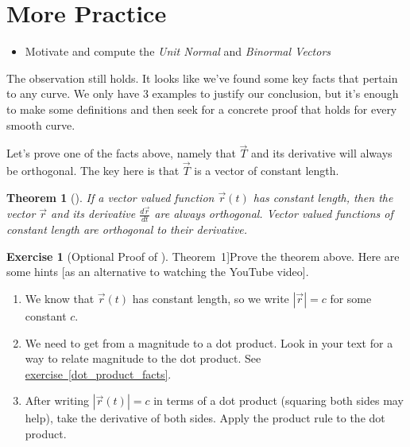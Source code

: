 \documentclass[10pt,]{book}
\theoremstyle{plain}
\newtheorem{theorem}{Theorem}[section]
\theoremstyle{definition}
\theoremstyle{definition}
\theoremstyle{definition}
\theoremstyle{definition}
\newtheorem{exploration}[project]{Exercise}
\theoremstyle{definition}
\numberwithin{equation}{section}
\newcommand{\ds}{\displaystyle}
\begin{document}
\section[{More Practice}]{More Practice}\label{section-27}
\leavevmode%
\begin{itemize}[label=\textbullet]
\item{}Motivate and compute the \emph{Unit Normal} and \emph{Binormal Vectors}%
\end{itemize}
The observation still holds. It looks like we've found some key facts that pertain to any curve. We only have 3 examples to justify our conclusion, but it's enough to make some definitions and then seek for a concrete proof that holds for every smooth curve.%
\par
Let's prove one of the facts above, namely that \(\vec T\) and its derivative will always be orthogonal. The key here is that \(\vec T\) is a vector of constant length.%
\begin{theorem}[{}]\label{vector_valued_functions_of_constant_length}
If a vector valued function \(\vec r(t)\) has constant length, then the vector \(\vec r\) and its derivative \(\ds\frac{d\vec r}{dt}\) are always orthogonal. Vector valued functions of constant length are orthogonal to their derivative.%
\end{theorem}
\begin{exploration}[Optional Proof of \hyperref[vector_valued_functions_of_constant_length]{Theorem~1}]\label{exploration-175}
Prove the theorem above. Here are some hints [as an alternative to watching the YouTube video]. \leavevmode%
\begin{itemize}[label=\textbullet]
\begin{enumerate}[font=\bfseries,label=(\alph*),ref=\alph*]
\item\label{task-432} We know that \(\vec r(t)\) has constant length, so we write \(|\vec r|=c\) for some constant \(c\).%
\item\label{task-433} We need to get from a magnitude to a dot product. Look in your text for a way to relate magnitude to the dot product. See \hyperref[dot_product_facts]{exercise~\ref{dot_product_facts}}.%
\item\label{task-434} After writing \(|\vec r(t)|=c\) in terms of a dot product (squaring both sides may help), take the derivative of both sides. Apply the product rule to the dot product.%
\end{enumerate}
\end{itemize}
%
\end{exploration}
\end{document}
